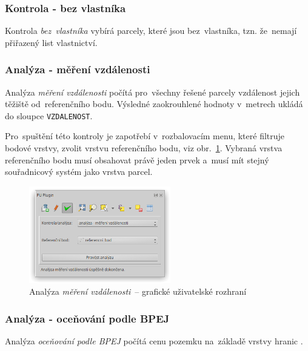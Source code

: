 \subsubsection{Kontrola - bez vlastníka}
\label{manual_kontrola_bez_vlastnika}

Kontrola \textit{bez~vlastníka} vybírá parcely, které jsou bez~vlastníka, tzn. že~nemají přiřazený list vlastnictví.

\subsubsection{Analýza - měření vzdálenosti}
\label{manual_analyza_vzdalenosti}

Analýza \textit{měření vzdálenosti} počítá pro~všechny řešené parcely vzdálenost jejich těžiště od~referenčního bodu. Výsledné zaokrouhlené hodnoty v~metrech ukládá do sloupce \texttt{VZDALENOST}.

Pro~spuštění této kontroly je zapotřebí v~rozbalovacím menu, které filtruje bodové vrstvy, zvolit vrstvu referenčního bodu, viz obr.~\ref{fig:manual_analyza_vzdalenosti_gui}. Vybraná vrstva referenčního bodu musí obsahovat právě jeden prvek a~musí mít stejný souřadnicový systém jako vrstva parcel.

	\begin{figure}[H]
		\centering
		\includegraphics[width=0.55\textwidth]{./pictures/analyza_vzdalenost.png}
		\caption[Analýza \textit{měření vzdálenosti}~– grafické uživatelské rozhraní]{Analýza \textit{měření vzdálenosti}~– grafické uživatelské rozhraní}
		\label{fig:manual_analyza_vzdalenosti_gui}
 	\end{figure}

\subsubsection{Analýza - oceňování podle BPEJ}
\label{manual_analyza_bpej}

Analýza \textit{oceňování podle BPEJ} počítá cenu pozemku na~základě vrstvy hranic .

